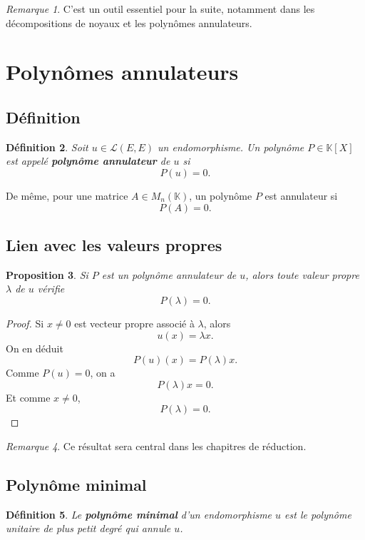 \documentclass[11pt,a4paper]{article}
\newtheorem{definition}{Définition}[section]
\newtheorem{proposition}[definition]{Proposition}
\theoremstyle{remark}
\newtheorem{remarque}[definition]{Remarque}
\newcommand{\K}{\mathbb{K}}
\newcommand{\Lin}{\mathcal{L}}
\begin{document}
\begin{remarque}
C’est un outil essentiel pour la suite, notamment dans les décompositions de noyaux et les polynômes annulateurs.
\end{remarque}

\section{Polynômes annulateurs}

\subsection{Définition}

\begin{definition}
Soit \(u\in\Lin(E,E)\) un endomorphisme.  
Un polynôme \(P\in\K[X]\) est appelé \textbf{polynôme annulateur} de \(u\) si
\[
P(u)=0.
\]
\end{definition}

De même, pour une matrice \(A\in M_n(\K)\), un polynôme \(P\) est annulateur si
\[
P(A)=0.
\]

\subsection{Lien avec les valeurs propres}

\begin{proposition}
Si \(P\) est un polynôme annulateur de \(u\), alors toute valeur propre \(\lambda\) de \(u\) vérifie
\[
P(\lambda)=0.
\]
\end{proposition}

\begin{proof}
Si \(x\neq 0\) est vecteur propre associé à \(\lambda\), alors
\[
u(x)=\lambda x.
\]
On en déduit
\[
P(u)(x)=P(\lambda)x.
\]
Comme \(P(u)=0\), on a
\[
P(\lambda)x=0.
\]
Et comme \(x\neq 0\),
\[
P(\lambda)=0.
\]
\end{proof}

\begin{remarque}
Ce résultat sera central dans les chapitres de réduction.
\end{remarque}

\subsection{Polynôme minimal}

\begin{definition}
Le \textbf{polynôme minimal} d’un endomorphisme \(u\) est le polynôme unitaire de plus petit degré qui annule \(u\).
\end{definition}
\end{document}
